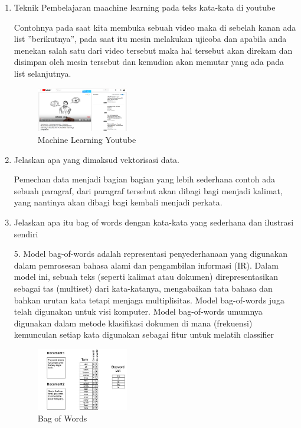 \begin{enumerate}
        \item Teknik Pembelajaran maachine learning pada teks kata-kata di youtube
        
        Contohnya pada saat kita membuka sebuah video maka di sebelah kanan ada list ”berikutnya”, pada saat itu mesin melakukan ujicoba dan apabila anda menekan salah satu dari video tersebut maka hal tersebut akan direkam dan disimpan oleh mesin tersebut dan kemudian akan memutar yang ada pada list selanjutnya.

        \begin{figure}[H]
            \includegraphics[width=4cm]{figures/1174086/chapter4/youtube.PNG}
            \centering
            \caption{Machine Learning Youtube}
        \end{figure}

        \item Jelaskan apa yang dimaksud vektorisasi data.
        
        Pemechan data menjadi bagian bagian yang lebih sederhana contoh ada sebuah paragraf, dari paragraf tersebut akan dibagi bagi menjadi kalimat, yang nantinya akan dibagi bagi kembali menjadi perkata.

        \item Jelaskan apa itu bag of words dengan kata-kata yang sederhana dan ilustrasi sendiri
        
        5.  Model bag-of-words adalah representasi penyederhanaan yang digunakan dalam pemrosesan bahasa alami dan pengambilan informasi (IR). Dalam model ini, sebuah teks (seperti kalimat atau dokumen) direpresentasikan sebagai tas (multiset) dari kata-katanya, mengabaikan tata bahasa dan bahkan urutan kata tetapi menjaga multiplisitas. Model bag-of-words juga telah digunakan untuk visi komputer. Model bag-of-words umumnya digunakan dalam metode klasifikasi dokumen di mana (frekuensi) kemunculan setiap kata digunakan sebagai fitur untuk melatih classifier
        \begin{figure}[H]
            \includegraphics[width=4cm]{figures/1174086/chapter4/bow.jpg}
            \centering
            \caption{Bag of Words}
        \end{figure}


\end{enumerate}
